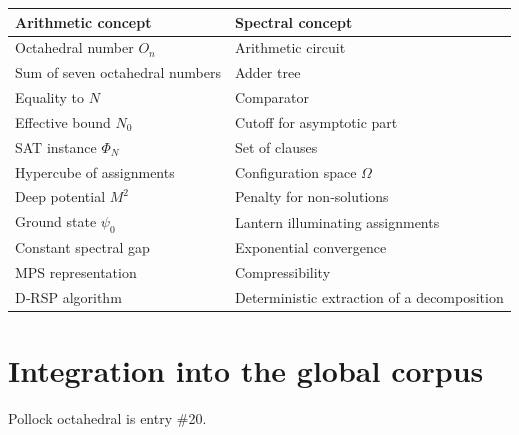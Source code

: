 \documentclass[11pt,a4paper]{article}
\begin{document}
\begin{center}
\small
\begin{tabular}{@{}l|l@{}}
\toprule
\textbf{Arithmetic concept} & \textbf{Spectral concept} \\
\midrule
Octahedral number $O_n$ & Arithmetic circuit \\
Sum of seven octahedral numbers & Adder tree \\
Equality to $N$ & Comparator \\
Effective bound $N_0$ & Cutoff for asymptotic part \\
SAT instance $\Phi_N$ & Set of clauses \\
Hypercube of assignments & Configuration space $\Omega$ \\
Deep potential $M^2$ & Penalty for non‑solutions \\
Ground state $\psi_0$ & Lantern illuminating assignments \\
Constant spectral gap & Exponential convergence \\
MPS representation & Compressibility \\
D‑RSP algorithm & Deterministic extraction of a decomposition \\
\bottomrule
\end{tabular}
\end{center}

\section{Integration into the global corpus}

Pollock octahedral is entry \#20.
\end{document}

